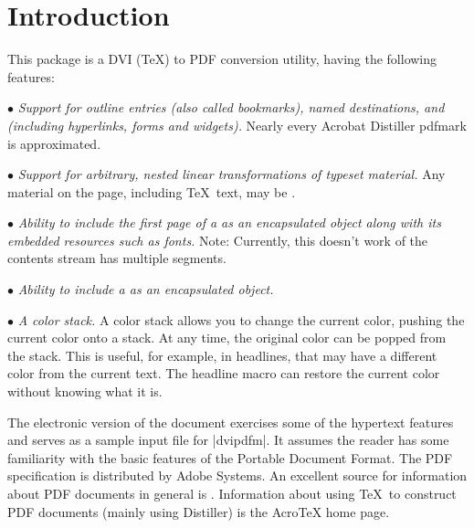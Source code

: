\section{Introduction}
This package is a DVI (\TeX) to PDF conversion utility,
having the following features:

\beginlist
\item{$\bullet$} {\it Support for outline entries (also called bookmarks), named destinations,
and  (including hyperlinks, forms and widgets).}  Nearly
every Acrobat Distiller pdfmark is approximated.

\item{$\bullet$} {\it Support for arbitrary, nested linear transformations
of typeset material.}  Any material on the page, including
\TeX\ text, may be   .

\item{$\bullet$} {\it Ability to include the first page of a  as
an encapsulated object along with its embedded resources such as fonts.}
Note:  Currently, this doesn't work of the contents stream
has multiple segments. 

\item{$\bullet$} {\it Ability to include a  as an encapsulated
object.}

\item{$\bullet$} {\it A color stack.} A color stack allows you to change the current color, pushing the
current color onto a stack.  At any time, the original color
can be popped from the stack.  This is useful, for example, in
headlines, that may have a different color from the current text.
The headline macro can restore the current color without knowing
what it is.
\endlist

The electronic version of the document exercises
some of the hypertext features and serves as
a sample input file for |dvipdfm|.
It assumes the reader has some familiarity with the basic features
of the Portable Document Format.  The PDF specification
is distributed by Adobe Systems.
An excellent source for information about PDF documents
in general is .  Information about
using \TeX\ to construct PDF documents (mainly using Distiller) is the
AcroTeX home page.

